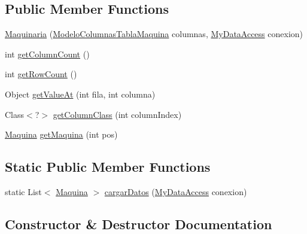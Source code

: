 \subsection*{Public Member Functions}
\begin{DoxyCompactItemize}
\item 
\mbox{\hyperlink{classmaquinas_1_1_maquinaria_adf1a7cb67d56325ab9689a85945a17bd}{Maquinaria}} (\mbox{\hyperlink{classmaquinas_1_1_modelo_columnas_tabla_maquina}{Modelo\+Columnas\+Tabla\+Maquina}} columnas, \mbox{\hyperlink{classconexion_s_q_l_1_1_my_data_access}{My\+Data\+Access}} conexion)
\item 
int \mbox{\hyperlink{classmaquinas_1_1_maquinaria_a4d573c7762633b39ef7305ecb1b6ffa3}{get\+Column\+Count}} ()
\item 
int \mbox{\hyperlink{classmaquinas_1_1_maquinaria_aeceaddd786b36d5be354b8e9a581caa3}{get\+Row\+Count}} ()
\item 
Object \mbox{\hyperlink{classmaquinas_1_1_maquinaria_a0fa4ffa21f2f3cc2386634fb4c8b810e}{get\+Value\+At}} (int fila, int columna)
\item 
Class$<$?$>$ \mbox{\hyperlink{classmaquinas_1_1_maquinaria_ae792351e004fa5f3d10900e33f10186d}{get\+Column\+Class}} (int column\+Index)
\item 
\mbox{\hyperlink{classmaquinas_1_1_maquina}{Maquina}} \mbox{\hyperlink{classmaquinas_1_1_maquinaria_a438161cbcee58e47e57c1c1f0d0207eb}{get\+Maquina}} (int pos)
\end{DoxyCompactItemize}
\subsection*{Static Public Member Functions}
\begin{DoxyCompactItemize}
\item 
static List$<$ \mbox{\hyperlink{classmaquinas_1_1_maquina}{Maquina}} $>$ \mbox{\hyperlink{classmaquinas_1_1_maquinaria_a8c8ade68894e4e32e50a0130d482bc5e}{cargar\+Datos}} (\mbox{\hyperlink{classconexion_s_q_l_1_1_my_data_access}{My\+Data\+Access}} conexion)
\end{DoxyCompactItemize}


\subsection{Constructor \& Destructor Documentation}
\mbox{\label{classmaquinas_1_1_maquinaria_adf1a7cb67d56325ab9689a85945a17bd}} 
